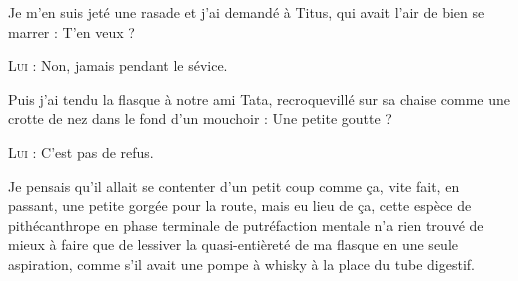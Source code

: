 \begin{dialogue}
Je m’en suis jeté une rasade et j’ai demandé à Titus, qui avait l’air de bien se marrer : T’en veux ?

\textsc{Lui} : Non, jamais pendant le sévice.

Puis j’ai tendu la flasque à notre ami Tata, recroquevillé sur sa chaise comme une crotte de nez dans le fond d’un mouchoir : Une petite goutte ?

\textsc{Lui} : C’est pas de refus.

\end{dialogue}

Je pensais qu’il allait se contenter d’un petit coup comme ça, vite fait, en passant, une petite gorgée pour la route, mais eu lieu de ça, cette espèce de pithécanthrope en phase terminale de putréfaction mentale n’a rien trouvé de mieux à faire que de lessiver la quasi-entièreté de ma flasque en une seule aspiration, comme s’il avait une pompe à whisky à la place du tube digestif.

